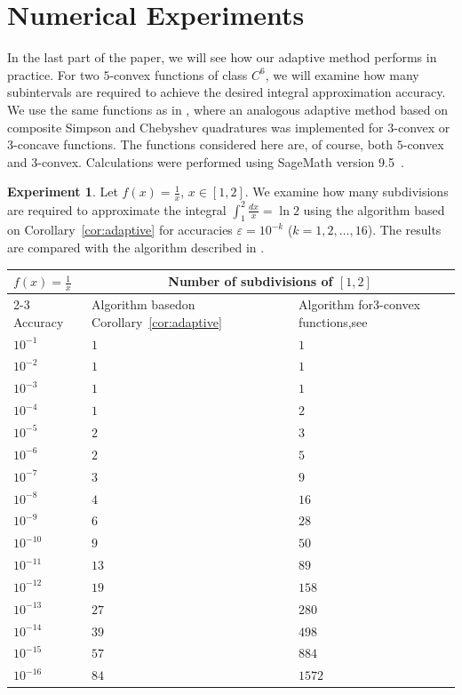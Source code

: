 \documentclass[12pt]{amsart}
\theoremstyle{definition}
\newtheorem{ex}{Experiment}
\begin{document}
\section{Numerical Experiments}

In the last part of the paper, we will see how our adaptive method performs in practice. For two $5$-convex functions of class $C^6$, we will examine how many subintervals are required to achieve the desired integral approximation accuracy. We use the same functions as in \cite{Was20}, where an analogous adaptive method based on composite Simpson and Chebyshev quadratures was implemented for $3$-convex or $3$-concave functions. The functions considered here are, of course, both $5$-convex and $3$-convex. Calculations were performed using SageMath version 9.5~\cite{sagemath95}.

\begin{ex}
Let $f(x)=\frac{1}{x}$, $x\in[1,2]$. We examine how many subdivisions are required to approximate the integral $\int_1^2 \frac{dx}{x} = \ln 2$ using the algorithm based on Corollary~\ref{cor:adaptive} for accuracies $\varepsilon=10^{-k}$ ($k=1,2,\dots,16$). The results are compared with the algorithm described in \cite{Was20}.

\begin{center}
\begin{tabular}{lp{4cm}p{4cm}}
 \hline
 $f(x)=\frac{1}{x}$ & \multicolumn{2}{c}{Number of subdivisions of $[1,2]$}\\\cline{2-3}
 Accuracy & Algorithm based\newline on Corollary~\ref{cor:adaptive}  & Algorithm for\newline $3$-convex functions,\newline see~\cite[Experiment 1]{Was20}\\
 \hline
 $10^{-1}$ & $1$  & $1$\\
 $10^{-2}$ & $1$ & $1$\\
 $10^{-3}$ & $1$ & $1$\\
 $10^{-4}$ & $1$ & $2$\\
 $10^{-5}$ & $2$ & $3$\\
 $10^{-6}$ & $2$ & $5$\\
 $10^{-7}$ & $3$ & $9$\\
 $10^{-8}$ & $4$ & $16$\\
 $10^{-9}$ & $6$ & $28$\\
 $10^{-10}$ & $9$ & $50$\\
 $10^{-11}$ & $13$ & $89$\\
 $10^{-12}$ & $19$ & $158$\\
 $10^{-13}$ & $27$ & $280$\\
 $10^{-14}$ & $39$ & $498$\\
 $10^{-15}$ & $57$ & $884$\\
 $10^{-16}$ & $84$ & $1572$
\end{tabular}
\end{center}

\end{ex}
\end{document}
